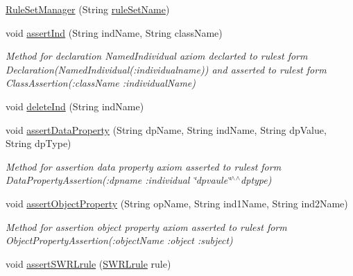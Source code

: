 \begin{DoxyCompactItemize}
\item 
\mbox{\hyperlink{classcom_1_1github_1_1aites_1_1framework_1_1ruleset_1_1_rule_set_manager_a2c0a81dac3552e5ab1426026efe6c760}{Rule\+Set\+Manager}} (String \mbox{\hyperlink{classcom_1_1github_1_1aites_1_1framework_1_1ruleset_1_1_rule_set_manager_aeb9d61ae7f558514e41f5ed18b00a56e}{rule\+Set\+Name}})
\item 
void \mbox{\hyperlink{classcom_1_1github_1_1aites_1_1framework_1_1ruleset_1_1_rule_set_manager_a318aa8ad8be68347f57363e374c429f5}{assert\+Ind}} (String ind\+Name, String class\+Name)
\begin{DoxyCompactList}\small\item\em Method for declaration Named\+Individual axiom declarted to rulest form Declaration(\+Named\+Individual(\+:individualname)) and asserted to rulest form Class\+Assertion(\+:class\+Name \+:individual\+Name) \end{DoxyCompactList}\item 
void \mbox{\hyperlink{classcom_1_1github_1_1aites_1_1framework_1_1ruleset_1_1_rule_set_manager_ab0ec00173eb4031052115d372aa53f8b}{delete\+Ind}} (String ind\+Name)
\item 
void \mbox{\hyperlink{classcom_1_1github_1_1aites_1_1framework_1_1ruleset_1_1_rule_set_manager_ae2e674642095f85bf5a8c14272e35c8a}{assert\+Data\+Property}} (String dp\+Name, String ind\+Name, String dp\+Value, String dp\+Type)
\begin{DoxyCompactList}\small\item\em Method for assertion data property axiom asserted to rulest form Data\+Property\+Assertion(\+:dpname \+:individual \char`\"{}dpvaule\char`\"{}$^\wedge$$^\wedge$dptype) \end{DoxyCompactList}\item 
void \mbox{\hyperlink{classcom_1_1github_1_1aites_1_1framework_1_1ruleset_1_1_rule_set_manager_ab36ee5e0e957168bb23480a202321f21}{assert\+Object\+Property}} (String op\+Name, String ind1\+Name, String ind2\+Name)
\begin{DoxyCompactList}\small\item\em Method for assertion object property axiom asserted to rulest form Object\+Property\+Assertion(\+:object\+Name \+:object \+:subject) \end{DoxyCompactList}\item 
void \mbox{\hyperlink{classcom_1_1github_1_1aites_1_1framework_1_1ruleset_1_1_rule_set_manager_afbff0052a67d70fd8023fba9bab1cb39}{assert\+S\+W\+R\+Lrule}} (\mbox{\hyperlink{classcom_1_1github_1_1aites_1_1framework_1_1rule_1_1_s_w_r_lrule}{S\+W\+R\+Lrule}} rule)

\end{DoxyCompactItemize}
